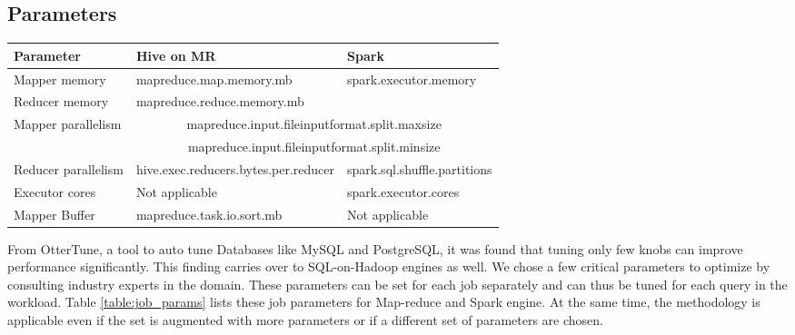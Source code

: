 \subsection{Parameters}


\begin{table*}
	\begin{center}
		\begin{tabular}{ |l|l|l| } 
			\hline
			Parameter & Hive on MR & Spark \\ 
			\hline
			Mapper memory & mapreduce.map.memory.mb & \multirow{2}{*}{spark.executor.memory} \\
			Reducer memory & mapreduce.reduce.memory.mb & \\
			\hline
			\multirow{2}{*}{Mapper parallelism} & \multicolumn{2}{|c|}{mapreduce.input.fileinputformat.split.maxsize} \\
			& \multicolumn{2}{|c|}{mapreduce.input.fileinputformat.split.minsize} \\
			\hline
			Reducer parallelism & hive.exec.reducers.bytes.per.reducer & spark.sql.shuffle.partitions \\
			\hline
			Executor cores & Not applicable & spark.executor.cores \\
			\hline
			Mapper Buffer & mapreduce.task.io.sort.mb & Not applicable \\
			\hline
		\end{tabular}
	\end{center}
	\caption{Parameters of the Job to be optimized}
	\label{table:job_params}	
\end{table*}


From OtterTune\cite{vanaken}, a tool to auto tune Databases like MySQL and PostgreSQL, it was found that tuning only few knobs can improve performance significantly. This finding carries over to SQL-on-Hadoop engines as well. We chose a few critical parameters to optimize by consulting industry experts in the domain. These parameters can be set for each job separately and can thus be tuned for each query in the workload. Table \ref{table:job_params} lists these job parameters for Map-reduce and Spark engine. At the same time, the methodology is applicable even if the set is augmented with more parameters or if a different set of parameters are chosen. 

